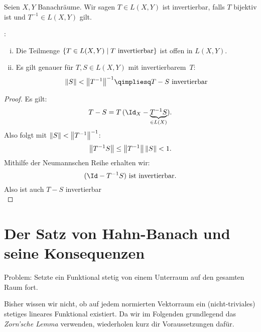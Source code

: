 \begin{thEmpty}
    Seien $X,Y$ Banachräume. Wir sagen $T\in L(X,Y)$ ist invertierbar, falls $T$
    bijektiv ist und $T^{-1}\in L(X,Y)$ gilt.
    
    \nnSatz:\hfill
    \begin{enumerate}[i)]
        \item 
            Die Teilmenge $\{ T\in L(X,Y) \Mid \text{$T$ invertierbar} \}$
            ist offen in $L(X,Y)$.
        \item
            Es gilt genauer für $T,S\in L(X,Y)$ mit invertierbarem~$T$:
            \[ \norm{S} < \norm*{T^{-1}}^{-1}
                \qimpliesq \text{$T-S$ invertierbar}
            \]
    \end{enumerate}
\end{thEmpty}

\begin{proof}
    Es gilt:
    \[ T-S = T \, (\Id_X - \underbrace{T^{-1}S}_{\in L(X)})  . \]
    Also folgt mit $\norm{S}<\norm*{T^{-1}}^{-1}$:
    \[ \norm*{T^{-1}S} \leq \norm*{T^{-1}} \, \norm{S} < 1  . \]
    Mithilfe der Neumannschen Reihe 
    erhalten wir:
    \[ (\Id-T^{-1}S) \text{ ist invertierbar}  . \]
    Also ist auch $T-S$ invertierbar
    \\
\end{proof}


\chapter{Der Satz von Hahn-Banach und seine Konsequenzen}
Problem: Setzte ein Funktional stetig von einem Unterraum auf den gesamten Raum
fort.

Bisher wissen wir nicht, ob auf jedem normierten Vektorraum ein
(nicht-triviales) stetiges lineares Funktional existiert. Da wir im Folgenden
grundlegend das \emph{Zorn'sche Lemma} verwenden, wiederholen kurz dir
Voraussetzungen dafür.

